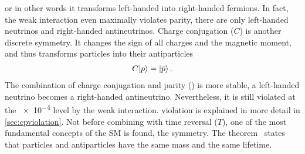 or in other words it transforms left-handed into right-handed fermions. In
fact, the weak interaction even maximally violates parity, \eg there are only
left-handed neutrinos and right-handed antineutrinos. Charge conjugation ($C$)
is another discrete symmetry. It changes the sign of all charges and the
magnetic moment, and thus transforms particles into their antiparticles
\begin{align}
	C |p\rangle = |\bar p\rangle\,.
\end{align}
The combination of charge conjugation and parity (\CP) is more stable,
\eg a left-handed neutrino becomes a right-handed antineutrino. Nevertheless,
it is still violated at the \num{e-4} level by the weak interaction. \CP
violation is explained in more detail in \cref{sec:cpviolation}. Not before
combining \CP with time reversal ($T$), one of the most fundamental concepts
of the SM is found, the \CPT symmetry. The \CPT
theorem~\cite{Schwinger:1951xk,Luders:1954zz,pauli1955niels} states that
particles and antiparticles have the same mass and the same lifetime.
